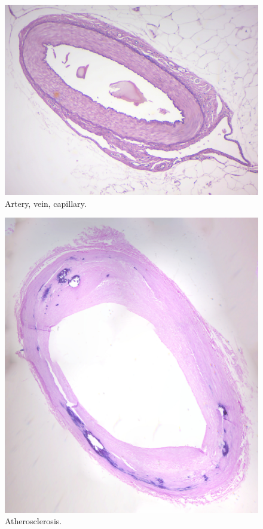 \begin{figure}

{\centering \includegraphics[width=0.7\linewidth]{./figures/anatomy/vessels}

}

\caption{Artery, vein, capillary.}\label{fig:vessels}
\end{figure}

\begin{figure}

{\centering \includegraphics[width=0.7\linewidth]{./figures/anatomy/atherosclerosis}

}

\caption{Atherosclerosis.}\label{fig:atherosclerosis}
\end{figure}

